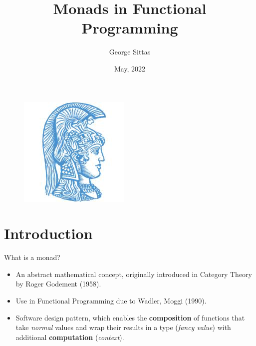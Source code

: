 \documentclass{beamer}
\author{George Sittas}
\title{Monads in Functional Programming}
\institute{
    Department of Informatics and Telecommunications (DiT) \\
    University of Athens
}
\date{May, 2022}
\begin{document}
\begin{frame}
    \titlepage
    \begin{figure}[htpb]
        \begin{center}
            \includegraphics[keepaspectratio, scale=0.28]{pic/ekpa.jpg}
        \end{center}
    \end{figure}
\end{frame}

\begin{frame}
    \tableofcontents[sectionstyle=show,subsectionstyle=show/shaded/hide,subsubsectionstyle=show/shaded/hide]
\end{frame}

\section{Introduction}

\begin{frame}{What is a monad?}
    \begin{itemize}
        \setlength \itemsep{1em}
        \item An abstract mathematical concept, originally introduced in
              Category Theory by Roger Godement (1958).
        \item Use in Functional Programming due to Wadler, Moggi (1990).
        \item Software design pattern, which enables the
              \textbf{composition} of functions that take
              \textit{normal} values and wrap their results in a type
              (\textit{fancy value}) with additional \textbf{computation}
              (\textit{context}).
    \end{itemize}
\end{frame}
\end{document}
